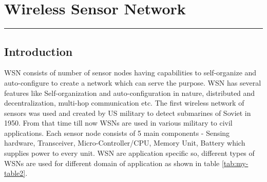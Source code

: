 \chapter{Wireless Sensor Network}
\label{C2} %
\graphicspath{{Figures/PDF/}{Figures/PNG/}}
\noindent\rule{\linewidth}{2pt}
\section{Introduction}
WSN consists of number of sensor nodes having capabilities to self-organize and auto-configure to create a network which can serve the purpose. WSN has several features like Self-organization and auto-configuration in nature, distributed and decentralization, multi-hop communication etc. The first wireless network of sensors was used and created by US military to detect submarines of Soviet in 1950. From that time till now WSNs are used in various military to civil applications. Each sensor node consists of 5 main components - Sensing hardware, Transceiver, Micro-Controller/CPU, Memory Unit, Battery which supplies power to every unit. WSN are application specific so, different types of WSNs are used for different domain of application \cite{articleTypesWSN} as shown in table \ref{tab:my-table2}.
\begin{table}[hb]
\centering
\caption{Types of WSN}
\label{tab:my-table2}
\end{table}
